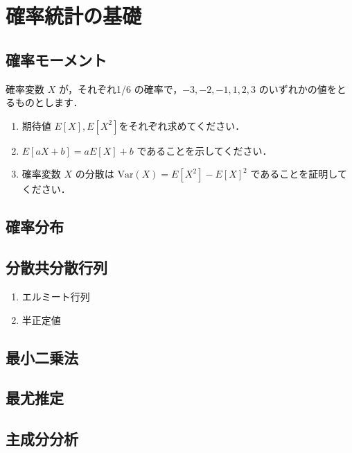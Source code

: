 \section{確率統計の基礎}

\subsection{確率モーメント}
  確率変数 $X$ が，それぞれ1/6 の確率で，$-3, -2, -1, 1, 2, 3$ のいずれかの値をとるものとします．
  \begin{enumerate}[label=(\roman*)]
    \item 期待値 $E[X], E[X^2]$をそれぞれ求めてください．
    \item $E[aX+b] = aE[X] + b$ であることを示してください．
    \item 確率変数 $X$ の分散は $\mathrm{Var}(X) = E[X^2] - E[X]^2$  であることを証明してください．
  \end{enumerate}

\subsection{確率分布}

\subsection{分散共分散行列}
  \begin{enumerate}[label=(\roman*)]
    \item エルミート行列
    \item 半正定値
  \end{enumerate}

\subsection{最小二乗法}

\subsection{最尤推定}

\subsection{主成分分析}
